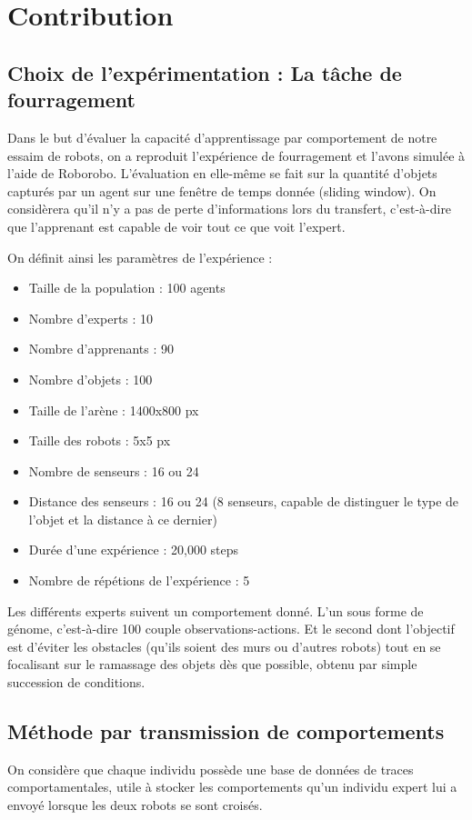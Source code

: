 \documentclass[a4paper, 12pt]{report}
\begin{document}
    \chapter{Contribution}
   
    \section{Choix de l'expérimentation : La tâche de fourragement}
    Dans le but d'évaluer la capacité d'apprentissage par comportement de notre essaim de robots, on a reproduit l'expérience de fourragement et l'avons simulée à l'aide de Roborobo.
    L'évaluation en elle-même se fait sur la quantité d'objets capturés par un agent sur une fenêtre de temps donnée (sliding window). On considèrera qu'il n'y a pas de perte d'informations lors du transfert, c'est-à-dire que l'apprenant est capable de voir tout ce que voit l'expert.
    
    On définit ainsi les paramètres de l'expérience :
    \begin{itemize}
    \item Taille de la population : 100 agents
    \item Nombre d'experts : 10
    \item Nombre d'apprenants : 90
    \item Nombre d'objets : 100
    \item Taille de l'arène : 1400x800 px
    \item Taille des robots : 5x5 px
    \item Nombre de senseurs : 16 ou 24
    \item Distance des senseurs : 16 ou 24 (8 senseurs, capable de distinguer le type de l'objet et la distance à ce dernier)
    \item Durée d'une expérience : 20,000 steps
    \item Nombre de répétions de l'expérience : 5
    \end{itemize}


Les différents experts suivent un comportement donné.
L'un sous forme de génome, c'est-à-dire 100 couple observations-actions.
Et le second dont l'objectif est d'éviter les obstacles (qu'ils soient des murs ou d'autres robots) tout en se focalisant sur le ramassage des objets dès que possible, obtenu par simple succession de conditions.


	\section{Méthode par transmission de comportements}
	On considère que chaque individu possède une base de données de traces comportamentales, utile à stocker les comportements qu'un individu expert lui a envoyé lorsque les deux robots se sont croisés.
	
\end{document}
